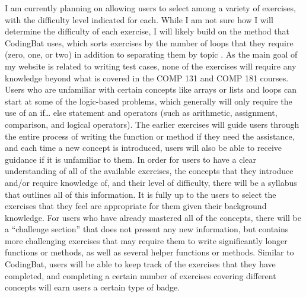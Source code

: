 \documentclass[10pt,twocolumn]{article}
\begin{document}
I am currently planning on allowing users to select among a variety of exercises, with the difficulty level indicated for each. While I am not sure how I will determine the difficulty of each exercise, I will likely build on the method that CodingBat uses, which sorts exercises by the number of loops that they require (zero, one, or two) in addition to separating them by topic \cite{CodingBat}. As the main goal of my website is related to writing test cases, none of the exercises will require any knowledge beyond what is covered in the COMP 131 and COMP 181 courses. Users who are unfamiliar with certain concepts like arrays or lists and loops can start at some of the logic-based problems, which generally will only require the use of an if… else statement and operators (such as arithmetic, assignment, comparison, and logical operators). The earlier exercises will guide users through the entire process of writing the function or method if they need the assistance, and each time a new concept is introduced, users will also be able to receive guidance if it is unfamiliar to them. In order for users to have a clear understanding of all of the available exercises, the concepts that they introduce and/or require knowledge of, and their level of difficulty, there will be a syllabus that outlines all of this information. It is fully up to the users to select the exercises that they feel are appropriate for them given their background knowledge. For users who have already mastered all of the concepts, there will be a “challenge section” that does not present any new information, but contains more challenging exercises that may require them to write significantly longer functions or methods, as well as several helper functions or methods. Similar to CodingBat, users will be able to keep track of the exercises that they have completed, and completing a certain number of exercises covering different concepts will earn users a certain type of badge.
\end{document}
